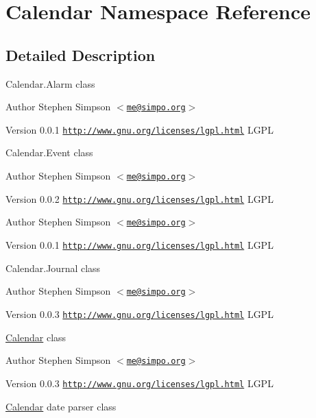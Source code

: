 \hypertarget{namespaceCalendar}{
\section{Calendar Namespace Reference}
\label{namespaceCalendar}
}


\subsection{Detailed Description}
Calendar.Alarm class

\begin{DoxyAuthor}{Author}
Stephen Simpson $<$\href{mailto:me@simpo.org}{\tt me@simpo.org}$>$ 
\end{DoxyAuthor}
\begin{DoxyVersion}{Version}
0.0.1  \href{http://www.gnu.org/licenses/lgpl.html}{\tt http://www.gnu.org/licenses/lgpl.html} LGPL
\end{DoxyVersion}
Calendar.Event class

\begin{DoxyAuthor}{Author}
Stephen Simpson $<$\href{mailto:me@simpo.org}{\tt me@simpo.org}$>$ 
\end{DoxyAuthor}
\begin{DoxyVersion}{Version}
0.0.2  \href{http://www.gnu.org/licenses/lgpl.html}{\tt http://www.gnu.org/licenses/lgpl.html} LGPL
\end{DoxyVersion}
\begin{DoxyAuthor}{Author}
Stephen Simpson $<$\href{mailto:me@simpo.org}{\tt me@simpo.org}$>$ 
\end{DoxyAuthor}
\begin{DoxyVersion}{Version}
0.0.1  \href{http://www.gnu.org/licenses/lgpl.html}{\tt http://www.gnu.org/licenses/lgpl.html} LGPL
\end{DoxyVersion}
Calendar.Journal class

\begin{DoxyAuthor}{Author}
Stephen Simpson $<$\href{mailto:me@simpo.org}{\tt me@simpo.org}$>$ 
\end{DoxyAuthor}
\begin{DoxyVersion}{Version}
0.0.3  \href{http://www.gnu.org/licenses/lgpl.html}{\tt http://www.gnu.org/licenses/lgpl.html} LGPL
\end{DoxyVersion}
\hyperlink{classCalendar}{Calendar} class

\begin{DoxyAuthor}{Author}
Stephen Simpson $<$\href{mailto:me@simpo.org}{\tt me@simpo.org}$>$ 
\end{DoxyAuthor}
\begin{DoxyVersion}{Version}
0.0.3  \href{http://www.gnu.org/licenses/lgpl.html}{\tt http://www.gnu.org/licenses/lgpl.html} LGPL
\end{DoxyVersion}
\hyperlink{classCalendar}{Calendar} date parser class


